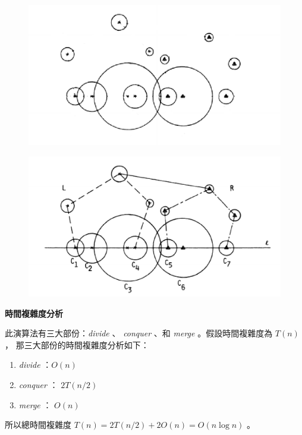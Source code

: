 \documentclass[12pt]{article}
\begin{document}
\begin{CJK}{UTF8}{bkai}
\begin{enumerate}
\end{enumerate}

\begin{figure}[h]
\includegraphics[scale=0.4]{figure3.eps}
\caption{}
\end{figure}

\begin{figure}[h]
\includegraphics[scale=0.4]{figure5(i).eps}
\caption{}
\end{figure}

\centerline{\bf 時間複雜度分析}

此演算法有三大部份：{\it divide} 、 {\it conquer} 、和 {\it merge} 。假設時間複雜度為 $T(n)$，
那三大部份的時間複雜度分析如下：\\

\begin{enumerate}
\item {\it divide} ：$O(n)$\\
\item {\it conquer} ： $2T(n/2)$\\
\item {\it merge} ： $O(n)$\\
\end{enumerate}

所以總時間複雜度 $T(n)=2T(n/2)+2O(n)=O(n\log n)$ 。

\end{CJK}
\end{document}
